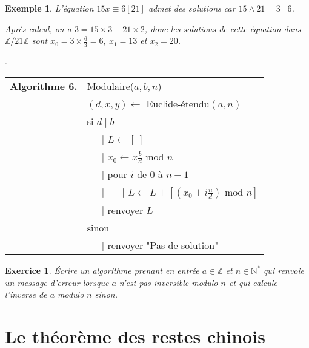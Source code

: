 \documentclass[12pt]{report}
\newtheorem*{ex}{Exemple}
\newtheorem*{exo}{Exercice}
\begin{document}
\begin{ex}
L'équation $15 x \equiv 6 [21]$ admet des solutions car $15\wedge 21=3 \mid 6$. \par 
Après calcul, on a $3= 15 \times 3 - 21 \times 2$, donc les solutions de cette équation dans $\mathbb{Z}/21 \mathbb{Z}$ sont $x_0=3 \times \tfrac63=6$, $x_1=13$ et $x_2=20$. 
\end{ex}


.

\begin{tabular}{ll}
\textbf{Algorithme 6.} & Modulaire($a,b,n$)\\
           & $(d,x,y)\leftarrow  $ Euclide-étendu$(a,n)$  \\
           & si $d \mid b$           \\
           & \ \ \ {\rm | } $ L \leftarrow [ \ ]  $  \\
           & \ \ \ {\rm | } $x_0 \leftarrow  x \tfrac{b}{d} \text{ mod }n $ \\
           & \ \ \ {\rm | }pour $i$ de 0 à $n-1$ \\
           & \ \ \ {\rm | } \ \ \ {\rm | } $L \leftarrow  L+  [(x_0 + i\tfrac{n}{d}) \text{ mod }n  ]$ \\    
           & \ \ \ {\rm | } renvoyer $L$ \\
           &  sinon \\
           &  \ \ \ {\rm | } renvoyer "Pas de solution" 
\end{tabular}


\begin{exo}
Écrire un algorithme prenant en entrée $a\in \mathbb{Z}$ et $n\in \mathbb{N}^*$ qui renvoie un message d'erreur lorsque $a$ n'est pas inversible modulo $n$ et qui calcule l'inverse de $a$ modulo $n$ sinon.
\end{exo}


\section{Le théorème des restes chinois}
\end{document}
